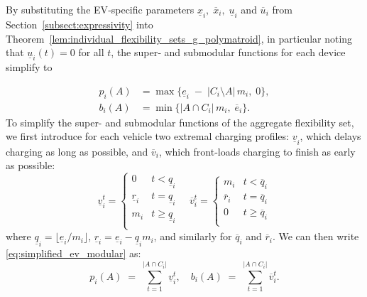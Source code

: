 By substituting the EV‐specific parameters \(\underline{x}_i,\;\overline{x}_i,\;\underline{u}_i\) and \(\overline{u}_i\) from Section~\ref{subsect:expressivity} into 
Theorem~\ref{lem:individual_flexibility_sets_g_polymatroid}, in particular noting that $\underline{u}_i(t) = 0$ for all $t$, the super‐ and submodular functions for each device simplify to

\begin{subequations}\label{eq:simplified_ev_modular}
\begin{align}
    p_i(A) &= \max\bigl\{\underline{e}_i \;-\; \lvert C_i \setminus A\rvert\,m_i,\; 0\bigr\},\\
    b_i(A) &= \min\bigl\{\lvert A \cap C_i\rvert\,m_i,\;\overline{e}_i\bigr\}.
\end{align}
\end{subequations}
To simplify the super- and submodular functions of the aggregate flexibility set, we first introduce for each vehicle two extremal charging profiles: \(\underline{v}_i\), which delays charging as long as possible, and \(\overline{v}_i\), which front‐loads charging to finish as early as possible:
\begin{equation}\label{eq:extremal_charging}
        \underline{v}^t_i = 
        \begin{cases}
            0                        & t <  \underline{q}_i \\
            \underline{r}_i          & t =  \underline{q}_i \\
            m_i                      & t \geq  \underline{q}_i \\
        \end{cases}
\quad
        \overline{v}^t_i = 
        \begin{cases}
            m_i                    & t <  \overline{q}_i \\
            \overline{r}_i         & t =  \overline{q}_i \\
            0                      & t \geq \overline{q}_i \\
        \end{cases}
    \end{equation}
where $\underline{q}_i = \lfloor \underline{e}_i / m_i \rfloor$, $\underline{r}_i = \underline{e}_i - \underline{q}_i m_i$, and similarly for $\overline{q}_i$ and $\overline{r}_i$. We can then write \eqref{eq:simplified_ev_modular} as:
\begin{equation}\label{eq:ev_v_rep}
    p_i(A) \;=\;\sum_{t=1}^{|A \cap C_i|} \underline{v}^t_i, 
    \quad
    b_i(A) \;=\;\sum_{t=1}^{|A \cap C_i|} \overline{v}^t_i.
\end{equation}


